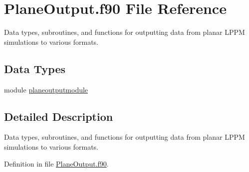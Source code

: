 \hypertarget{PlaneOutput_8f90}{\section{Plane\+Output.\+f90 File Reference}
\label{PlaneOutput_8f90}
}


Data types, subroutines, and functions for outputting data from planar L\+P\+P\+M simulations to various formats.  


\subsection*{Data Types}
\begin{DoxyCompactItemize}
\item 
module \hyperlink{classplaneoutputmodule}{planeoutputmodule}
\end{DoxyCompactItemize}


\subsection{Detailed Description}
Data types, subroutines, and functions for outputting data from planar L\+P\+P\+M simulations to various formats. 



Definition in file \hyperlink{PlaneOutput_8f90_source}{Plane\+Output.\+f90}.

